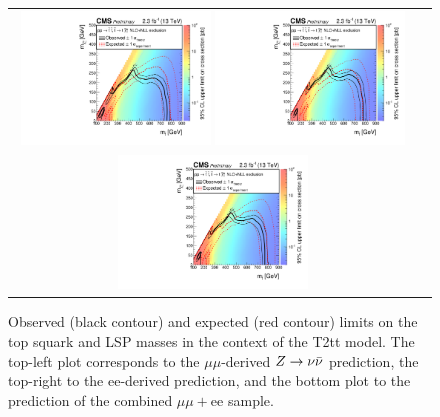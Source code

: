 \begin{figure}[htbp]
  \begin{center}
  \begin{tabular}{cc}
\hspace{-1.5cm}
  \includegraphics[angle=0,width=0.48\textwidth]{figures/SusySearches/HadStop2015/HadStopT2tt_Mu.pdf}
  \includegraphics[angle=0,width=0.48\textwidth]{figures/SusySearches/HadStop2015/HadStopT2tt_El.pdf}\\
    \includegraphics[angle=0,width=0.48\textwidth]{figures/SusySearches/HadStop2015/HadStopT2tt_MuEl.pdf}
  \end{tabular}
  \caption{Observed (black contour) and expected (red contour) limits on the top squark and LSP masses in the context of the T2tt model. The top-left plot corresponds to the $\mu\mu$-derived $Z\rightarrow \nu\bar{\nu}$ prediction, the top-right to the ee-derived prediction, and the bottom plot to the prediction of the combined $\mu\mu+$ee sample.}
    \label{fig:fulllimit_T2tt}
  \end{center}
\end{figure}


